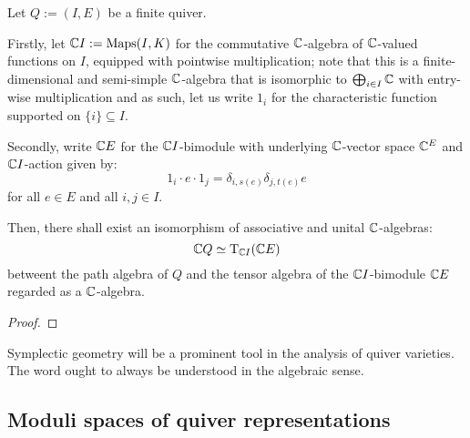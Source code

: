         \begin{proposition} \label{prop: universal_property_of_path_algebras_of_finite_quivers}
            Let $Q := (I, E)$ be a finite quiver.
            
            Firstly, let $\mathbb{C} I := \mathrm{Maps}(I, K)$ for the commutative $\mathbb{C}$-algebra of $\mathbb{C}$-valued functions on $I$, equipped with pointwise multiplication; note that this is a finite-dimensional and semi-simple $\mathbb{C}$-algebra that is isomorphic to $\bigoplus_{i \in I} \mathbb{C}$ with entry-wise multiplication and as such, let us write $1_i$ for the characteristic function supported on $\{i\} \subseteq I$.

            Secondly, write $\mathbb{C} E$ for the $\mathbb{C} I$-bimodule with underlying $\mathbb{C}$-vector space $\mathbb{C}^E$ and $\mathbb{C} I$-action given by:
                $$1_i \cdot e \cdot 1_j = \delta_{i, s(e)} \delta_{j, t(e)} e$$
            for all $e \in E$ and all $i, j \in I$. 

            Then, there shall exist an isomorphism of associative and unital $\mathbb{C}$-algebras:
                $$\mathbb{C} Q \simeq \mathrm{T}_{\mathbb{C} I}( \mathbb{C} E )$$
            betweent the path algebra of $Q$ and the tensor algebra of the $\mathbb{C} I$-bimodule $\mathbb{C} E$ regarded as a $\mathbb{C}$-algebra. 
        \end{proposition}
            \begin{proof}
                
            \end{proof}

        \begin{convention}
            Symplectic geometry will be a prominent tool in the analysis of quiver varieties. The word  ought to always be understood in the algebraic sense. 
        \end{convention}
    
        \subsection{Moduli spaces of quiver representations}
            
    
    \printbibliography

